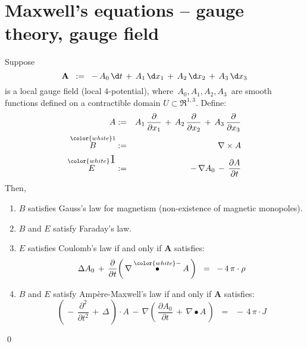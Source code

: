 

\section{Maxwell's equations -- gauge theory, gauge field}
\setcounter{theorem}{0}
\setcounter{equation}{0}


\renewcommand{\theenumi}{\roman{enumi}}
\renewcommand{\labelenumi}{\textnormal{(\theenumi)}$\;\;$}


\begin{theorem}
\mbox{}
\vskip 0.2cm
\noindent
Suppose
\begin{equation*}
\mathbf{A}
\;\; := \;\;
	-\,A_{0}\,\d t \,+\, A_{1}\,\d x_{1}  \,+\, A_{2}\,\d x_{2}  \,+\, A_{3}\,\d x_{3}
\end{equation*}
is a local gauge field (local $4$-potential), where
\,$A_{0}, A_{1}, A_{2}, A_{3}$\,
are smooth functions defined on a contractible domain $U \subset \Re^{1,3}$.
\vskip 0.3cm
\noindent
Define:
\begin{eqnarray*}
A
& := &
	A_{1}\,\dfrac{\partial}{\partial x_{1}} \,+\, A_{2}\,\dfrac{\partial}{\partial x_{2}} \,+\, A_{3}\,\dfrac{\partial}{\partial x_{3}}
\\
\overset{{\color{white}1}}{B}
& := &
	\nabla \times A
\\
\overset{{\color{white}\textnormal{\Large$1$}}}{E}
& := &
	-\,\nabla A_{0} \,-\, \dfrac{\partial A}{\partial t}
\end{eqnarray*}
Then,
\begin{enumerate}
\item
	$B$ satisfies Gauss's law for magnetism (non-existence of magnetic monopoles).
\item
	$B$ and $E$ satisfy Faraday's law.
\item
	$E$ satisfies Coulomb's law if and only if $\mathbf{A}$ satisfies:
	\begin{equation*}
	\Delta A_{0} \,+\, \dfrac{\partial}{\partial t}\!\left(\,\nabla \overset{{\color{white}-}}{\bullet} A\,\right)
	\;\; = \;\;
		- \, 4\,\pi \cdot \rho
	\end{equation*}
\item
	$B$ and $E$ satisfy Amp\`{e}re-Maxwell's law if and only if $\mathbf{A}$ satisfies:
	\begin{equation*}
	\left(\, -\,\dfrac{\partial^{2}}{\partial t^{2}} \,+\, \Delta \,\right) \cdot A
	\,-\,
	\nabla\left(\,\dfrac{\partial A_{0}}{\partial t} \,+\, \nabla\bullet A\,\right)
	\;\; = \;\;
		- \, 4\,\pi \cdot J
	\end{equation*}
\end{enumerate}
\end{theorem}
\proof

\qed






